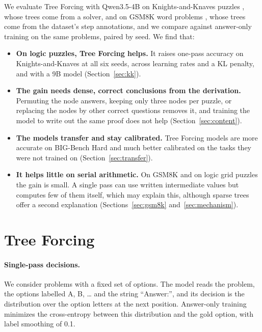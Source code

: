 \documentclass[10pt]{article}
\newcommand{\tf}{Tree Forcing}
\begin{document}
We evaluate \tf{} with Qwen3.5-4B on Knights-and-Knaves puzzles \citep{xie2024kk}, whose trees come from a solver,
and on GSM8K word problems \citep{cobbe2021gsm8k}, whose trees come from the dataset's step annotations, and we compare
against answer-only training on the same problems, paired by seed. We find that:
\begin{itemize}
  \item \textbf{On logic puzzles, \tf{} helps.} It raises one-pass accuracy on Knights-and-Knaves at all six seeds,
  across learning rates and a KL penalty, and with a 9B model (Section~\ref{sec:kk}).
  \item \textbf{The gain needs dense, correct conclusions from the derivation.} Permuting the node answers, keeping
  only three nodes per puzzle, or replacing the nodes by other correct questions removes it, and training the model to
  write out the same proof does not help (Section~\ref{sec:content}).
  \item \textbf{The models transfer and stay calibrated.} \tf{} models are more accurate on BIG-Bench Hard and much
  better calibrated on the tasks they were not trained on (Section~\ref{sec:transfer}).
  \item \textbf{It helps little on serial arithmetic.} On GSM8K and on logic grid puzzles the gain is small. A
  single pass can use written intermediate values but computes few of them itself, which may explain this, although
  sparse trees offer a second explanation (Sections~\ref{sec:gsm8k} and~\ref{sec:mechanism}).
\end{itemize}

\section{Tree Forcing}
\label{sec:method}

\paragraph{Single-pass decisions.} We consider problems with a fixed set of options. The model reads the problem, the
options labelled A, B, \ldots{} and the string ``Answer:'', and its decision is the distribution over the option
letters at the next position. Answer-only training minimizes the cross-entropy between this distribution and the gold
option, with label smoothing of 0.1.
\end{document}

